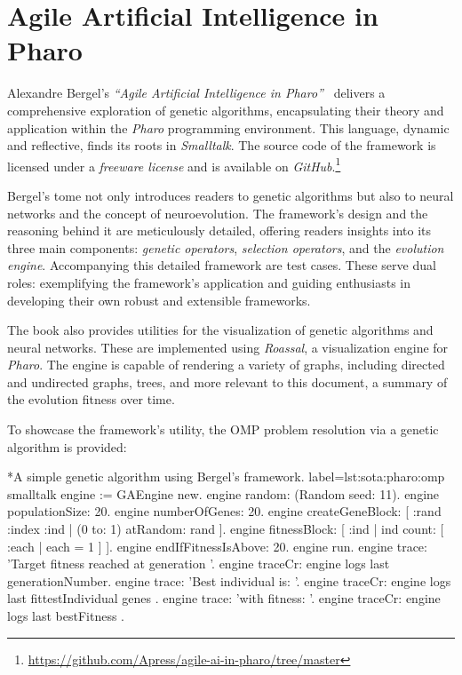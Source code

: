 \section{Agile Artificial Intelligence in Pharo}
\label{sec:sota:pharo}
  Alexandre Bergel's \emph{\enquote{Agile Artificial Intelligence in 
  Pharo}}~\autocite{bergelAgileArtificialIntelligence2020} delivers a 
  comprehensive exploration of genetic algorithms, encapsulating their theory 
  and application within the \textit{Pharo} programming environment.
  This language, dynamic and reflective, finds its roots in \textit{Smalltalk}.
  The source code of the framework is licensed under a \textit{freeware license}
  and is available on 
  \textit{GitHub}.\footnote{\url{https://github.com/Apress/agile-ai-in-pharo/tree/master}}

  Bergel's tome not only introduces readers to genetic algorithms but also to 
  neural networks and the concept of neuroevolution.
  The framework's design and the reasoning behind it are meticulously detailed, 
  offering readers insights into its three main components: \emph{genetic 
  operators}, \emph{selection operators}, and the \emph{evolution engine}.
  Accompanying this detailed framework are test cases.
  These serve dual roles: exemplifying the framework's application and guiding 
  enthusiasts in developing their own robust and extensible frameworks.

  The book also provides utilities for the visualization of genetic algorithms
  and neural networks.
  These are implemented using \textit{Roassal}, a visualization engine for
  \textit{Pharo}.
  The engine is capable of rendering a variety of graphs, including directed and
  undirected graphs, trees, and more relevant to this document, a summary of the
  evolution fitness over time.
  
  To showcase the framework's utility, the OMP problem resolution via a genetic 
  algorithm is provided:

  \begin{code}*{A simple genetic algorithm using Bergel's framework.}{
    label=lst:sota:pharo:omp
  }{smalltalk}
    engine := GAEngine new.
    engine random: (Random seed: 11).
    engine populationSize: 20.
    engine numberOfGenes: 20.
    engine createGeneBlock: [ :rand :index :ind |
      (0 to: 1) atRandom: rand ].
    engine fitnessBlock: [ :ind | ind count: [ :each | each = 1 ] ].
    engine endIfFitnessIsAbove: 20.
    engine run.
    engine trace: 'Target fitness reached at generation '.
    engine traceCr: engine logs last generationNumber.
    engine trace: 'Best individual is: '.
    engine traceCr: engine logs last fittestIndividual genes .
    engine trace: 'with fitness: '.
    engine traceCr: engine logs last bestFitness .
  \end{code}

